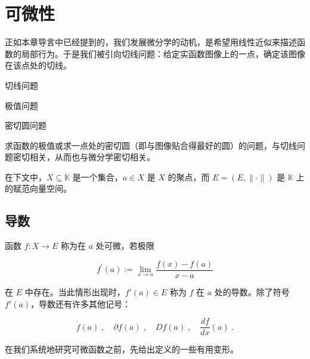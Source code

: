 \section{可微性}

正如本章导言中已经提到的，我们发展微分学的动机，是希望用线性近似来描述函数的局部行为。于是我们被引向切线问题：给定实函数图像上的一点，确定该图像在该点处的切线。


切线问题


极值问题


密切圆问题

求函数的极值或求一点处的密切圆（即与图像贴合得最好的圆）的问题，与切线问题密切相关，从而也与微分学密切相关。

在下文中，$X \subseteq \mathbb{K}$ 是一个集合，$a \in X$ 是 $X$ 的聚点，而 $E = (E, \|\cdot\|)$ 是 $\mathbb{K}$ 上的赋范向量空间。

\subsection*{导数}

函数 $ f: X \to E $ 称为在 $a$ 处可微，若极限

\[
f^{\prime}(a):=\lim_{x\to a}\frac{f(x)-f(a)}{x-a}
\]

在 $E$ 中存在。当此情形出现时，$f'(a) \in E$ 称为 $f$ 在 $a$ 处的导数。除了符号 $f'(a)$，导数还有许多其他记号：

\[
\dot{f}(a)\;,\quad\partial f(a)\;,\quad D f(a)\;,\quad\frac{d f}{d x}(a)\;.
\]

在我们系统地研究可微函数之前，先给出定义的一些有用变形。

